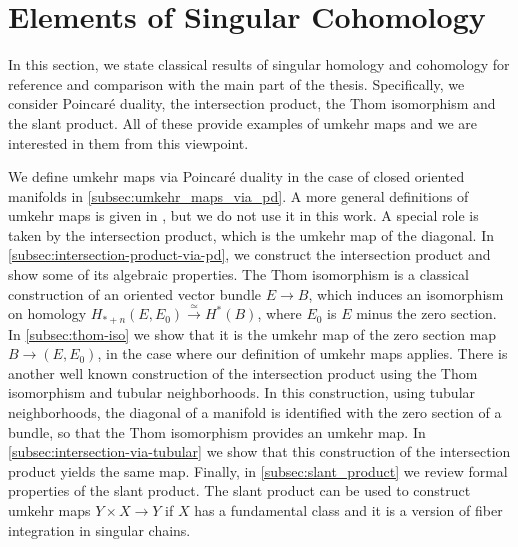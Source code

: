 \documentclass{scrartcl}
\theoremstyle{plain}
\theoremstyle{definition}
\newcommand{\quiso}{\simeq}
\let\xto\xrightarrow
\DeclareMathOperator{\coGraphs}{{}^*Graphs}
\begin{document}



\newpage
\appendix





\section{Elements of Singular Cohomology}

In this section, we state classical results of singular homology and cohomology for reference and comparison with the main part of the thesis. Specifically, we consider Poincaré duality, the intersection product, the Thom isomorphism and the slant product. All of these provide examples of umkehr maps and we are interested in them from this viewpoint. 


We define umkehr maps via Poincaré duality in the case of closed oriented manifolds in \cref{subsec:umkehr_maps_via_pd}. A more general definitions of umkehr maps is given in \cite{cohen2009umkehr}, but we do not use it in this work. A special role is taken by the intersection product, which is the umkehr map of the diagonal. In \cref{subsec:intersection-product-via-pd}, we construct the intersection product and show some of its algebraic properties. The Thom isomorphism is a classical construction of an oriented vector bundle $E\to B$, which induces an isomorphism on homology $H_{*+n}(E, E_0) \xto{\quiso} H^{*}(B)$, where $E_0$ is $E$ minus the zero section. In \cref{subsec:thom-iso} we show that it is the umkehr map of the zero section map $B\to (E, E_0)$, in the case where our definition of umkehr maps applies. There is another well known construction of the intersection product using the Thom isomorphism and tubular neighborhoods. In this construction, using tubular neighborhoods, the diagonal of a manifold is identified with the zero section of a bundle, so that the Thom isomorphism provides an umkehr map. In \cref{subsec:intersection-via-tubular} we show that this construction of the intersection product yields the same map. Finally, in \cref{subsec:slant_product} we review formal properties of the slant product. The slant product can be used to construct umkehr maps $Y\times X\to Y$ if $X$ has a fundamental class and it is a version of fiber integration in singular chains. 
\end{document}

